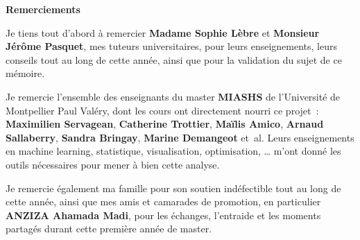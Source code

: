 {\vspace*{3cm}

\begin{center}
\Large\textbf{Remerciements}
\end{center}

\vspace{1cm}

Je tiens tout d'abord à remercier \textbf{Madame Sophie Lèbre} et \textbf{Monsieur Jérôme Pasquet}, mes tuteurs universitaires, pour leurs enseignements, leurs conseils tout au long de cette année, ainsi que pour la validation du sujet de ce mémoire.

Je remercie l'ensemble des enseignants du master \textbf{MIASHS} de l'Université de Montpellier Paul Valéry, dont les cours ont directement nourri ce projet~: \textbf{Maximilien Servagean}, \textbf{Catherine Trottier}, \textbf{Maïlis Amico}, \textbf{Arnaud Sallaberry}, \textbf{Sandra Bringay}, \textbf{Marine Demangeot} et~al. Leurs enseignements en machine learning, statistique, visualisation, optimisation, \ldots{} m'ont donné les outils nécessaires pour mener à bien cette analyse.

Je remercie également ma famille pour son soutien indéfectible tout au long de cette année, ainsi que mes amis et camarades de promotion, en particulier \textbf{ANZIZA Ahamada Madi}, pour les échanges, l'entraide et les moments partagés durant cette première année de master.

\vspace{1cm}
}
\newpage
